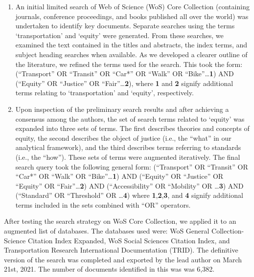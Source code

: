 \documentclass[
  letterpaper,
  DIV=11,
  numbers=noendperiod]{scrartcl}
\begin{document}
\begin{enumerate}
\def\labelenumi{\arabic{enumi}.}
\item
  An initial limited search of Web of Science (WoS) Core Collection
  (containing journals, conference proceedings, and books published all
  over the world) was undertaken to identify key documents. Separate
  searches using the terms `transportation' and `equity' were generated.
  From these searches, we examined the text contained in the titles and
  abstracts, the index terms, and subject heading searches when
  available. As we developed a clearer outline of the literature, we
  refined the terms used for the search. This took the form:
  (``Transport'' OR ``Transit'' OR ``Car*'' OR ``Walk'' OR
  ``Bike''\ldots{}\textbf{1}) AND (``Equity'' OR ``Justice'' OR
  ``Fair''\ldots{}\textbf{2}), where \textbf{1} and \textbf{2} signify
  additional terms relating to `transportation' and `equity',
  respectively.
\item
  Upon inspection of the preliminary search results and after achieving
  a consensus among the authors, the set of search terms related to
  `equity' was expanded into three sets of terms. The first describes
  theories and concepts of equity, the second describes the object of
  justice (i.e., the ``what'' in our analytical framework), and the
  third describes terms referring to standards (i.e., the ``how'').
  These sets of terms were augmented iteratively. The final search query
  took the following general form: (``Transport'' OR ``Transit'' OR
  ``Car*'' OR ``Walk'' OR ``Bike''\ldots{}\textbf{1}) AND (``Equity'' OR
  ``Justice'' OR ``Equity'' OR ``Fair''\ldots{}\textbf{2}) AND
  (``Accessibility'' OR ``Mobility'' OR \ldots{}\textbf{3}) AND
  (``Standard'' OR ``Threshold'' OR \ldots{}\textbf{4}) where
  \textbf{1},\textbf{2},\textbf{3}, and \textbf{4} signify additional
  terms included in the sets combined with ``OR'' operators.
\end{enumerate}

After testing the search strategy on WoS Core Collection, we applied it
to an augmented list of databases. The databases used were: WoS General
Collection-Science Citation Index Expanded, WoS Social Sciences Citation
Index, and Transportation Research International Documentation (TRID).
The definitive version of the search was completed and exported by the
lead author on March 21st, 2021. The number of documents identified in
this was was 6,382.
\end{document}
